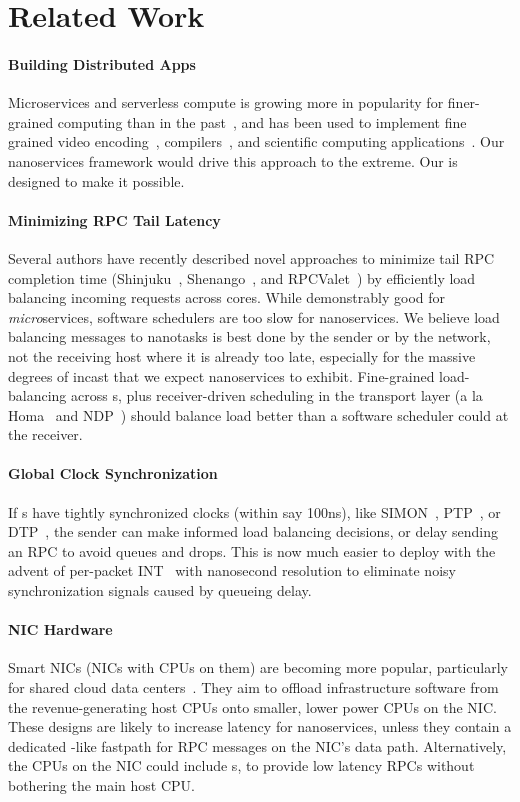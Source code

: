 \section{Related Work}

\paragraph{Building Distributed Apps}
Microservices and serverless compute is growing more in popularity for finer-grained computing than in the past~\cite{aws-lambda, gcloud-functions, azure-functions}, and has been used to implement fine grained video encoding~\cite{ExCamera}, compilers~\cite{gg}, and scientific computing applications~\cite{PyWren}.
Our nanoservices framework would drive this approach to the extreme. Our \name{} is designed to make it possible.

\paragraph{Minimizing RPC Tail Latency}
Several authors have recently described novel approaches to minimize tail RPC completion time (Shinjuku~\cite{shinjuku}, Shenango~\cite{shenango}, and RPCValet~\cite{rpcvalet}) by efficiently load balancing incoming requests across cores. While demonstrably good for {\em micro}services, software schedulers are too slow for nanoservices. We believe load balancing messages to nanotasks is best done by the sender or by the network, not the receiving host where it is already too late, especially for the massive degrees of incast that we expect nanoservices to exhibit. Fine-grained load-balancing across \name{}s, plus receiver-driven scheduling in the transport layer (a la Homa~\cite{homa} and NDP~\cite{ndp}) should balance load better than a software scheduler could at the receiver. 

\paragraph{Global Clock Synchronization} If \name{}s have tightly synchronized clocks (within say 100ns), like SIMON~\cite{10.5555/3323234.3323280}, PTP~\cite{rfc8173}, or DTP~\cite{dtp}, the sender can make informed load balancing decisions, or delay sending an RPC to avoid queues and drops. This is now much easier to deploy with the advent of per-packet INT~\cite{INT} with nanosecond resolution to eliminate noisy synchronization signals caused by queueing delay.  

\paragraph{NIC Hardware}
Smart NICs (NICs with CPUs on them) are becoming more popular, particularly for shared cloud data centers~\cite{nitro, bluefield, pensando}. They aim to offload infrastructure software from the revenue-generating host CPUs onto smaller, lower power CPUs on the NIC. These designs are likely to increase latency for nanoservices, unless they contain a dedicated \name{}-like fastpath for RPC messages on the NIC's data path. Alternatively, the CPUs on the NIC could include \name{}s, to provide low latency RPCs without bothering the main host CPU. 

